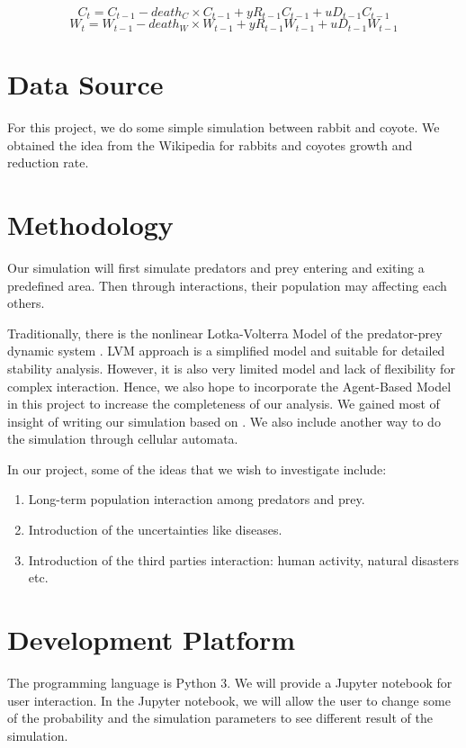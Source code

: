 \documentclass{article}
\begin{document}
\begin{normalsize}
		
		
		\begin{equation}
		    C_{t} = C_{t-1} - death_C \times C_{t-1} + yR_{t-1}C_{t-1} + u D_{t-1}C_{t-1}
		\end{equation}
		\begin{equation}
		    W_{t} = W_{t-1} - death_W \times W_{t-1} + yR_{t-1}W_{t-1} + u D_{t-1}W_{t-1}
		\end{equation}
		\section{Data Source}
		For this project, we do some simple simulation between rabbit and coyote. We obtained the idea from the Wikipedia for rabbits and coyotes growth and reduction rate.
	
		\section{Methodology}
		Our simulation will first simulate predators and prey entering and exiting a predefined area. Then through interactions, their population may affecting each others.
		
		Traditionally, there is the nonlinear Lotka-Volterra Model of the predator-prey dynamic system \cite{inproceedings, 1102729}. LVM approach is a simplified model and suitable for detailed stability analysis. However, it is also very limited model and lack of flexibility for complex interaction. Hence, we also hope to incorporate the Agent-Based Model \cite{Hodzic} in this project to increase the completeness of our analysis. We gained most of insight of writing our simulation based on \cite{Sayama2013}. We also include another way to do the simulation through cellular automata.
		
		In our project, some of the ideas that we wish to investigate include:
		\begin{enumerate}
			\item Long-term population interaction among predators and prey.
			\item Introduction of the uncertainties like diseases.
			\item Introduction of the third parties interaction: human activity, natural disasters etc.
		\end{enumerate}
		
		\section{Development Platform}
		The programming language is Python 3. We will provide a Jupyter notebook for user interaction.
		In the Jupyter notebook, we will allow the user to change some of the probability and the simulation parameters to see different result of the simulation.
		

\end{normalsize}
\end{document}
